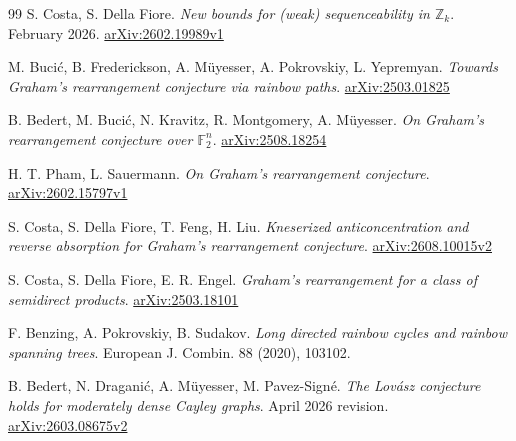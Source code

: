 \begin{thebibliography}{99}
 S. Costa, S. Della Fiore. \emph{New bounds for (weak) sequenceability in $\mathbb Z_k$}. February 2026. \href{https://arxiv.org/abs/2602.19989v1}{arXiv:2602.19989v1}

 M. Buci\'c, B. Frederickson, A. M\"uyesser, A. Pokrovskiy, L. Yepremyan. \emph{Towards Graham's rearrangement conjecture via rainbow paths}. \href{https://arxiv.org/abs/2503.01825}{arXiv:2503.01825}

 B. Bedert, M. Buci\'c, N. Kravitz, R. Montgomery, A. M\"uyesser. \emph{On Graham's rearrangement conjecture over $\mathbb F_2^n$}. \href{https://arxiv.org/abs/2508.18254}{arXiv:2508.18254}

 H. T. Pham, L. Sauermann. \emph{On Graham's rearrangement conjecture}. \href{https://arxiv.org/abs/2602.15797v1}{arXiv:2602.15797v1}

 S. Costa, S. Della Fiore, T. Feng, H. Liu. \emph{Kneserized anticoncentration and reverse absorption for Graham's rearrangement conjecture}. \href{https://arxiv.org/abs/2608.10015v2}{arXiv:2608.10015v2}

 S. Costa, S. Della Fiore, E. R. Engel. \emph{Graham's rearrangement for a class of semidirect products}. \href{https://arxiv.org/abs/2503.18101}{arXiv:2503.18101}

 F. Benzing, A. Pokrovskiy, B. Sudakov. \emph{Long directed rainbow cycles and rainbow spanning trees}. European J. Combin. 88 (2020), 103102.

 B. Bedert, N. Dragani\'c, A. M\"uyesser, M. Pavez-Sign\'e. \emph{The Lov\'asz conjecture holds for moderately dense Cayley graphs}. April 2026 revision. \href{https://arxiv.org/abs/2603.08675v2}{arXiv:2603.08675v2}

\end{thebibliography}
